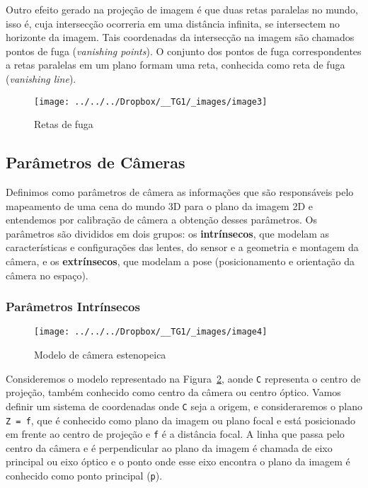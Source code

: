 \documentclass[ecp,tc]{iiufrgs}
\begin{document}
Outro efeito gerado na projeção de imagem é que duas retas paralelas no mundo, isso é, cuja intersecção ocorreria em uma distância infinita, se intersectem no horizonte da imagem. Tais coordenadas da intersecção na imagem são chamados pontos de fuga (\textit{vanishing points}). O conjunto dos pontos de fuga correspondentes a retas paralelas em um plano formam uma reta, conhecida como reta de fuga (\textit{vanishing line}).

\begin{figure}
	\centering
	\caption{Retas de fuga}
	\texttt{[image: ../../../Dropbox/\_\_TG1/\_images/image3]}
	\label{fig:image3}
\end{figure}

\subsection{Parâmetros de Câmeras}
Definimos como parâmetros de câmera as informações que são responsáveis pelo mapeamento de uma cena do mundo 3D para o plano da imagem 2D e entendemos por calibração de câmera a obtenção desses parâmetros. Os parâmetros são divididos em dois grupos: os \textbf{intrínsecos}, que modelam as características e configurações das lentes, do sensor e a geometria e montagem da câmera, e os \textbf{extrínsecos}, que modelam a pose (posicionamento e orientação da câmera no espaço).

\subsubsection{Parâmetros Intrínsecos}

\begin{figure}
	\centering
	\caption{Modelo de câmera estenopeica}
	\texttt{[image: ../../../Dropbox/\_\_TG1/\_images/image4]}
	\label{fig:image4}
\end{figure}

Consideremos o modelo representado na Figura~\ref{fig:image4}, aonde \texttt{C} representa o centro de projeção, também conhecido como centro da câmera ou centro óptico. Vamos definir um sistema de coordenadas onde \texttt{C} seja a origem, e consideraremos o plano \texttt{Z = f}, que é conhecido como plano da imagem ou plano focal e está posicionado em frente ao centro de projeção e \texttt{f} é a distância focal. A linha que passa pelo centro da câmera e é perpendicular ao plano da imagem é chamada de eixo principal ou eixo óptico e o ponto onde esse eixo encontra o plano da imagem é conhecido como ponto principal (\texttt{p}).
\end{document}

